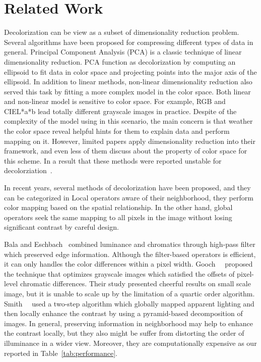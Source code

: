 \section{Related Work}
\label{sec:related}


Decolorization can be view as a subset of dimensionality reduction problem.
Several algorithms have been proposed for compressing different types of data in general.
Principal Component Analysis (PCA) is a classic technique
of linear dimensionality reduction.
PCA function as decolorization by computing an ellipsoid to fit data in color space
and projecting points into the major axis of the ellipsoid.
In addition to linear methods, non-linear dimensionality reduction also served this task 
by fitting a more complex model in the color space. 
Both linear and non-linear model is sensitive to color space.
For example, RGB and CIEL*a*b lead totally different grayscale images in practice.
Despite of the complexity of the model using in this scenario, 
the main concern is that weather the color space reveal helpful hints
for them to explain data and perform mapping on it.
However, limited papers apply dimensionality reduction into their framework,
and even less of them discuss about the property of color space for this scheme. 
In a result that these methods were reported unstable for decolorziation~\cite{Gooch:2005:CSC}.

In recent years, several methods of decolorization have been proposed,
and they can be categorized in
Local operators aware of their neighborhood, they perform color mapping based on the spatial
relationship. 
In the other hand, global operators seek the same mapping to all pixels in the image
without losing significant contrast by careful design.

Bala and Eschbach~\cite{Bala:2004:SCT} combined luminance and chromatics through
high-pass filter which preserved edge information.
Although the filter-based operators is efficient, it can only handles the color differences
within a pixel width.
Gooch~\etal~\cite{Gooch:2005:CSC} proposed the technique that optimizes grayscale images
which satisfied the offsets of pixel-level chromatic differences.
Their study presented cheerful results on small scale image, but it is unable to scale up
by the limitation of a quartic order algorithm.
Smith~\etal~\cite{Smith:2008:AGA} used a two-step algorithm which 
globally mapped apparent lighting and then locally enhance the contrast by using
a pyramid-based decomposition of images.
In general, preserving information in neighborhood may help to enhance the contrast locally,
but they also might be suffer from distorting the order of illuminance in a wider view.
Moreover, they are computationally expensive as our reported in Table~\ref{tab:performance}.


